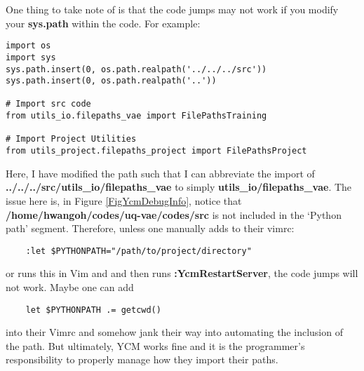 One thing to take note of is that the code jumps may not work if you modify your
\textbf{sys.path} within the code. For example:
\begin{lstlisting}
import os
import sys
sys.path.insert(0, os.path.realpath('../../../src'))
sys.path.insert(0, os.path.realpath('..'))

# Import src code
from utils_io.filepaths_vae import FilePathsTraining

# Import Project Utilities
from utils_project.filepaths_project import FilePathsProject
\end{lstlisting}
Here, I have modified the path such that I can abbreviate the import of
\textbf{../../../src/utils\_io/filepaths\_vae} to simply
\textbf{utils\_io/filepaths\_vae}. The issue here is, in Figure
\ref{FigYcmDebugInfo}, notice that \textbf{/home/hwangoh/codes/uq-vae/codes/src}
is not included in the `Python path' segment. Therefore, unless one manually
adds to their vimrc:
\begin{lstlisting}
    :let $PYTHONPATH="/path/to/project/directory"
\end{lstlisting}
or runs this in Vim and and then runs \textbf{:YcmRestartServer}, the code jumps
will not work. Maybe one can add
\begin{lstlisting}
    let $PYTHONPATH .= getcwd()
\end{lstlisting}
into their Vimrc and somehow jank their way into automating the inclusion of the
path. But ultimately, YCM works fine and it is the programmer's responsibility
to properly manage how they import their paths.

